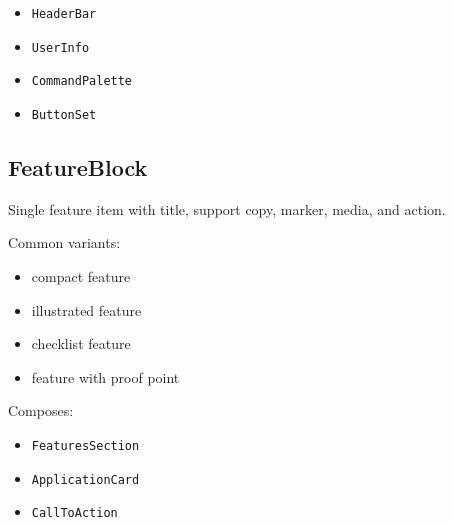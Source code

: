 \begin{itemize}
\tightlist
\item
  \texttt{H\allowbreak{}e\allowbreak{}a\allowbreak{}d\allowbreak{}e\allowbreak{}r\allowbreak{}B\allowbreak{}a\allowbreak{}r}
\item
  \texttt{U\allowbreak{}s\allowbreak{}e\allowbreak{}r\allowbreak{}I\allowbreak{}n\allowbreak{}f\allowbreak{}o}
\item
  \texttt{C\allowbreak{}o\allowbreak{}m\allowbreak{}m\allowbreak{}a\allowbreak{}n\allowbreak{}d\allowbreak{}P\allowbreak{}a\allowbreak{}l\allowbreak{}e\allowbreak{}t\allowbreak{}t\allowbreak{}e}
\item
  \texttt{B\allowbreak{}u\allowbreak{}t\allowbreak{}t\allowbreak{}o\allowbreak{}n\allowbreak{}S\allowbreak{}e\allowbreak{}t}
\end{itemize}

\subsection{FeatureBlock}\label{record-128-featureblock}

Single feature item with title, support copy, marker, media, and action.

Common variants:

\begin{itemize}
\tightlist
\item
  compact feature
\item
  illustrated feature
\item
  checklist feature
\item
  feature with proof point
\end{itemize}

Composes:

\begin{itemize}
\tightlist
\item
  \texttt{F\allowbreak{}e\allowbreak{}a\allowbreak{}t\allowbreak{}u\allowbreak{}r\allowbreak{}e\allowbreak{}s\allowbreak{}S\allowbreak{}e\allowbreak{}c\allowbreak{}t\allowbreak{}i\allowbreak{}o\allowbreak{}n}
\item
  \texttt{A\allowbreak{}p\allowbreak{}p\allowbreak{}l\allowbreak{}i\allowbreak{}c\allowbreak{}a\allowbreak{}t\allowbreak{}i\allowbreak{}o\allowbreak{}n\allowbreak{}C\allowbreak{}a\allowbreak{}r\allowbreak{}d}
\item
  \texttt{C\allowbreak{}a\allowbreak{}l\allowbreak{}l\allowbreak{}T\allowbreak{}o\allowbreak{}A\allowbreak{}c\allowbreak{}t\allowbreak{}i\allowbreak{}o\allowbreak{}n}
\end{itemize}

